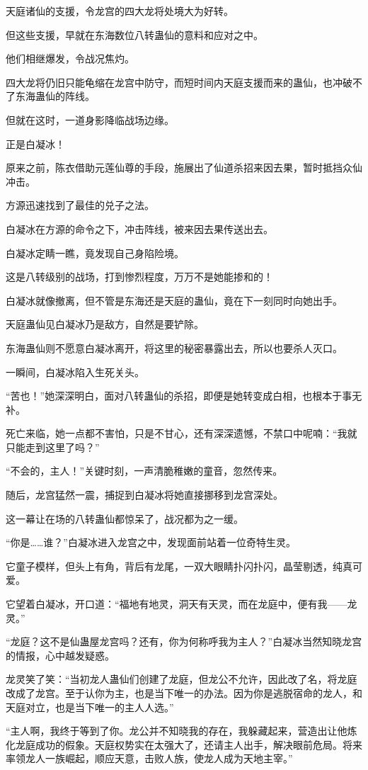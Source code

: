\begin{this_body}
天庭诸仙的支援，令龙宫的四大龙将处境大为好转。

但这些支援，早就在东海数位八转蛊仙的意料和应对之中。

他们相继爆发，令战况焦灼。

四大龙将仍旧只能龟缩在龙宫中防守，而短时间内天庭支援而来的蛊仙，也冲破不了东海蛊仙的阵线。

但就在这时，一道身影降临战场边缘。

正是白凝冰！

原来之前，陈衣借助元莲仙尊的手段，施展出了仙道杀招来因去果，暂时抵挡众仙冲击。

方源迅速找到了最佳的兑子之法。

白凝冰在方源的命令之下，冲击阵线，被来因去果传送出去。

白凝冰定睛一瞧，竟发现自己身陷险境。

这是八转级别的战场，打到惨烈程度，万万不是她能掺和的！

白凝冰就像撤离，但不管是东海还是天庭的蛊仙，竟在下一刻同时向她出手。

天庭蛊仙见白凝冰乃是敌方，自然是要铲除。

东海蛊仙则不愿意白凝冰离开，将这里的秘密暴露出去，所以也要杀人灭口。

一瞬间，白凝冰陷入生死关头。

“苦也！”她深深明白，面对八转蛊仙的杀招，即便是她转变成白相，也根本于事无补。

死亡来临，她一点都不害怕，只是不甘心，还有深深遗憾，不禁口中呢喃：“我就只能走到这里了吗？”

“不会的，主人！”关键时刻，一声清脆稚嫩的童音，忽然传来。

随后，龙宫猛然一震，捕捉到白凝冰将她直接挪移到龙宫深处。

这一幕让在场的八转蛊仙都惊呆了，战况都为之一缓。

“你是……谁？”白凝冰进入龙宫之中，发现面前站着一位奇特生灵。

它童子模样，但头上有角，背后有龙尾，一双大眼睛扑闪扑闪，晶莹剔透，纯真可爱。

它望着白凝冰，开口道：“福地有地灵，洞天有天灵，而在龙庭中，便有我——龙灵。”

“龙庭？这不是仙蛊屋龙宫吗？还有，你为何称呼我为主人？”白凝冰当然知晓龙宫的情报，心中越发疑惑。

龙灵笑了笑：“当初龙人蛊仙们创建了龙庭，但龙公不允许，因此改了名，将龙庭改成了龙宫。至于认你为主，也是当下唯一的办法。因为你是逃脱宿命的龙人，和天庭对立，也是当下唯一的主人人选。”

“主人啊，我终于等到了你。龙公并不知晓我的存在，我躲藏起来，营造出让他炼化龙庭成功的假象。天庭权势实在太强大了，还请主人出手，解决眼前危局。将来率领龙人一族崛起，顺应天意，击败人族，使龙人成为天地主宰。”


\end{this_body}
